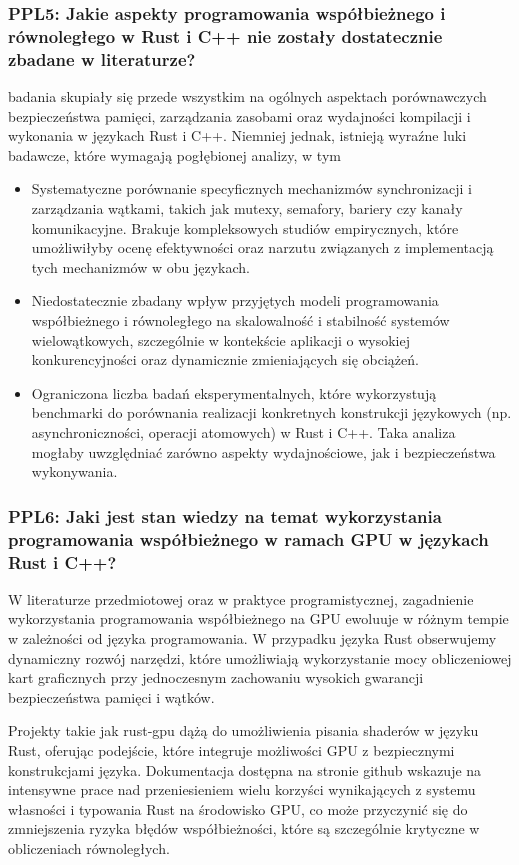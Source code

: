 \subsubsection{PPL5: Jakie aspekty programowania współbieżnego i równoległego w Rust i C++ nie zostały dostatecznie zbadane w literaturze?}
badania skupiały się przede wszystkim na ogólnych aspektach porównawczych bezpieczeństwa pamięci, zarządzania zasobami oraz wydajności kompilacji i wykonania w językach Rust i C++. Niemniej jednak, istnieją wyraźne luki badawcze, które wymagają pogłębionej analizy, w tym
\begin{itemize}
    \item Systematyczne porównanie specyficznych mechanizmów synchronizacji i zarządzania wątkami, takich jak mutexy, semafory, bariery czy kanały komunikacyjne. Brakuje kompleksowych studiów empirycznych, które umożliwiłyby ocenę efektywności oraz narzutu związanych z implementacją tych mechanizmów w obu językach.
    \item Niedostatecznie zbadany wpływ przyjętych modeli programowania współbieżnego i równoległego na skalowalność i stabilność systemów wielowątkowych, szczególnie w kontekście aplikacji o wysokiej konkurencyjności oraz dynamicznie zmieniających się obciążeń.
    \item Ograniczona liczba badań eksperymentalnych, które wykorzystują benchmarki do porównania realizacji konkretnych konstrukcji językowych (np. asynchroniczności, operacji atomowych) w Rust i C++. Taka analiza mogłaby uwzględniać zarówno aspekty wydajnościowe, jak i bezpieczeństwa wykonywania.
\end{itemize}


\subsubsection{PPL6: Jaki jest stan wiedzy na temat wykorzystania programowania współbieżnego w ramach GPU w językach Rust i C++?}
W literaturze przedmiotowej oraz w praktyce programistycznej, zagadnienie wykorzystania programowania współbieżnego na GPU ewoluuje w różnym tempie w zależności od języka programowania. W przypadku języka Rust obserwujemy dynamiczny rozwój narzędzi, które umożliwiają wykorzystanie mocy obliczeniowej kart graficznych przy jednoczesnym zachowaniu wysokich gwarancji bezpieczeństwa pamięci i wątków.

Projekty takie jak rust‑gpu \cite{rustgpuRust} dążą do umożliwienia pisania shaderów w języku Rust, oferując podejście, które integruje możliwości GPU z bezpiecznymi konstrukcjami języka. Dokumentacja dostępna na stronie github \cite{rustgpuRust} wskazuje na intensywne prace nad przeniesieniem wielu korzyści wynikających z systemu własności i typowania Rust na środowisko GPU, co może przyczynić się do zmniejszenia ryzyka błędów współbieżności, które są szczególnie krytyczne w obliczeniach równoległych.

